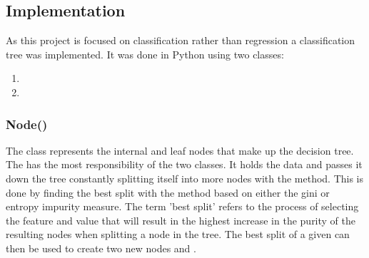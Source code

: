 \subsection{Implementation}
As this project is focused on classification rather than regression a classification tree was implemented.
It was done in Python using two classes:\\
\begin{enumerate}
    \item {}
    \item {}
    \end{enumerate}
\vspace{10pt}

\subsubsection{Node()}
The  class represents the internal and leaf nodes that make up the decision tree.
The  has the most responsibility of the two classes.
It holds the data and passes it down the tree constantly splitting itself into more nodes with the  method.
This is done by finding the best split with the  method based on either the gini or entropy impurity measure.
The term 'best split' refers to the process of selecting the feature and value that will result in the highest increase in the purity of the resulting nodes when splitting a node in the tree.
The best split of a given  can then be used to create two new nodes  and .


